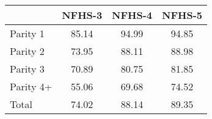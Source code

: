 \begin{tabular}{l*{3}{c}}
\toprule
            &\multicolumn{1}{c}{NFHS-3}&\multicolumn{1}{c}{NFHS-4}&\multicolumn{1}{c}{NFHS-5}\\
\midrule
\midrule
Parity 1    &       85.14&       94.99&       94.85\\
Parity 2    &       73.95&       88.11&       88.98\\
Parity 3    &       70.89&       80.75&       81.85\\
Parity 4+   &       55.06&       69.68&       74.52\\
Total       &       74.02&       88.14&       89.35\\
\bottomrule
\end{tabular}
